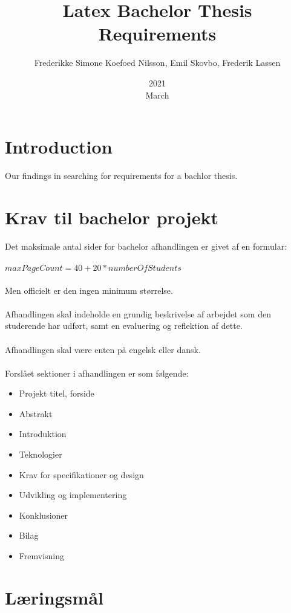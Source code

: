 \documentclass[a4paper,12pt]{article}
\title{Latex Bachelor Thesis Requirements}
\date{2021\\March}
\author{Frederikke Simone Koefoed Nilsson, Emil Skovbo, Frederik Lassen}
\begin{document}
\maketitle
\thispagestyle{empty}
\clearpage
{}

\tableofcontents
\clearpage

\section{Introduction}
Our findings in searching for requirements for a bachlor thesis.
\section{Krav til bachelor projekt}

Det maksimale antal sider for bachelor afhandlingen er givet af en formular: \\ \\
$maxPageCount = 40 + 20 * numberOfStudents $ \\ \\
Men officielt er den ingen minimum størrelse. \\ \\
Afhandlingen skal indeholde en grundig beskrivelse af arbejdet som den studerende har udført, samt en evaluering og reflektion af dette. \\ \\
Afhandlingen skal være enten på engelsk eller dansk.\\ \\
Forslået sektioner i afhandlingen er som følgende:

\begin{itemize}

\item Projekt titel, forside
\item Abstrakt
\item Introduktion
\item Teknologier
\item Krav for specifikationer og design
\item Udvikling og implementering
\item Konklusioner
\item Bilag
\item Fremvisning

\end{itemize}

\clearpage

\section{Læringsmål}
\end{document}
